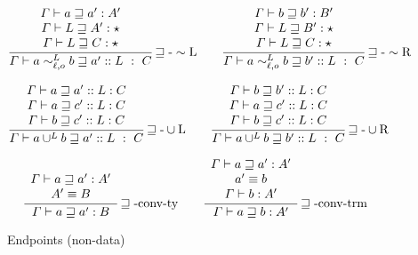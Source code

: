 \begin{figure}
\begin{align*}
  \frac{\begin{array}{c}
  \varGamma\vdash a\sqsupseteq a':A'\\
  \varGamma\vdash L\sqsupseteq A':\star\\
  \varGamma\vdash L\sqsupseteq C:\star
  \end{array}}{\varGamma\vdash a\sim_{\ell,o}^{L}b\sqsupseteq a'::L\ :\ C}\rulename{\sqsupseteq-\sim L}
  \quad & \quad 
  \frac{\begin{array}{c}
  \varGamma\vdash b\sqsupseteq b':B'\\
  \varGamma\vdash L\sqsupseteq B':\star\\
  \varGamma\vdash L\sqsupseteq C:\star
  \end{array}}{\varGamma\vdash a\sim_{\ell,o}^{L}b\sqsupseteq b'::L\ :\ C}\rulename{\sqsupseteq-\sim R}
\\
\end{align*}

\begin{align*}
  \frac{\begin{array}{c}
  \varGamma\vdash a\sqsupseteq a'::L:C\\
  \varGamma\vdash a\sqsupseteq c'::L:C\\
  \varGamma\vdash b\sqsupseteq c'::L:C
  \end{array}}{\varGamma\vdash a\cup^{L}b\sqsupseteq a'::L\ :\ C}\rulename{\sqsupseteq-\cup L}
  \quad & \quad 
  \frac{\begin{array}{c}
  \varGamma\vdash b\sqsupseteq b'::L:C\\
  \varGamma\vdash a\sqsupseteq c'::L:C\\
  \varGamma\vdash b\sqsupseteq c'::L:C
  \end{array}}{\varGamma\vdash a\cup^{L}b\sqsupseteq b'::L\ :\ C}\rulename{\sqsupseteq-\cup R}
\\
\end{align*}

\begin{align*}
  \frac{\begin{array}{c}
  \varGamma\vdash a\sqsupseteq a':A'\\
  A'\equiv B
  \end{array}}{\varGamma\vdash a\sqsupseteq a':B}\operatorname{\sqsupseteq-conv-ty}
  \quad & \quad 
  \frac{\begin{array}{c}
  \varGamma\vdash a\sqsupseteq a':A'\\
  a'\equiv b\\
  \varGamma\vdash b:A'
  \end{array}}{\varGamma\vdash a\sqsupseteq b:A'}\operatorname{\sqsupseteq-conv-trm}
\\
\end{align*}

\caption{Endpoints (non-data)}
\label{fig:cast-endpoint-rules}
\end{figure}

